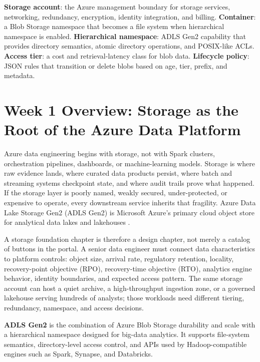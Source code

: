 \begin{keyterms}
\textbf{Storage account}: the Azure management boundary for storage services, networking, redundancy, encryption, identity integration, and billing.\quad
\textbf{Container}: a Blob Storage namespace that becomes a file system when hierarchical namespace is enabled.\quad
\textbf{Hierarchical namespace}: ADLS Gen2 capability that provides directory semantics, atomic directory operations, and POSIX-like ACLs.\quad
\textbf{Access tier}: a cost and retrieval-latency class for blob data.\quad
\textbf{Lifecycle policy}: JSON rules that transition or delete blobs based on age, tier, prefix, and metadata.
\end{keyterms}

\section{Week 1 Overview: Storage as the Root of the Azure Data Platform}
Azure data engineering begins with storage, not with Spark clusters, orchestration pipelines, dashboards, or machine-learning models. Storage is where raw evidence lands, where curated data products persist, where batch and streaming systems checkpoint state, and where audit trails prove what happened. If the storage layer is poorly named, weakly secured, under-protected, or expensive to operate, every downstream service inherits that fragility. Azure Data Lake Storage Gen2 (ADLS Gen2) is Microsoft Azure's primary cloud object store for analytical data lakes and lakehouses \cite{microsoft2025adlsgen2}.

A storage foundation chapter is therefore a design chapter, not merely a catalog of buttons in the portal. A senior data engineer must connect data characteristics to platform controls: object size, arrival rate, regulatory retention, locality, recovery-point objective (RPO), recovery-time objective (RTO), analytics engine behavior, identity boundaries, and expected access pattern. The same storage account can host a quiet archive, a high-throughput ingestion zone, or a governed lakehouse serving hundreds of analysts; those workloads need different tiering, redundancy, namespace, and access decisions.

\begin{definitionbox}
\textbf{ADLS Gen2} is the combination of Azure Blob Storage durability and scale with a hierarchical namespace designed for big-data analytics. It supports file-system semantics, directory-level access control, and APIs used by Hadoop-compatible engines such as Spark, Synapse, and Databricks.
\end{definitionbox}

